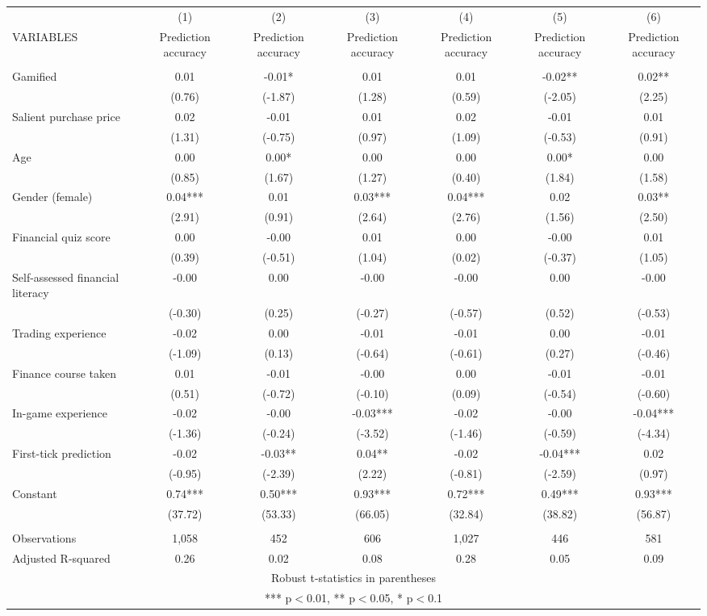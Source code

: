 \documentclass[]{article}
\begin{document}
\begin{tabular}{lcccccc} \hline
 & (1) & (2) & (3) & (4) & (5) & (6) \\
VARIABLES & Prediction accuracy & Prediction accuracy & Prediction accuracy & Prediction accuracy & Prediction accuracy & Prediction accuracy \\ \hline
 &  &  &  &  &  &  \\
Gamified & 0.01 & -0.01* & 0.01 & 0.01 & -0.02** & 0.02** \\
 & (0.76) & (-1.87) & (1.28) & (0.59) & (-2.05) & (2.25) \\
Salient purchase price & 0.02 & -0.01 & 0.01 & 0.02 & -0.01 & 0.01 \\
 & (1.31) & (-0.75) & (0.97) & (1.09) & (-0.53) & (0.91) \\
Age & 0.00 & 0.00* & 0.00 & 0.00 & 0.00* & 0.00 \\
 & (0.85) & (1.67) & (1.27) & (0.40) & (1.84) & (1.58) \\
Gender (female) & 0.04*** & 0.01 & 0.03*** & 0.04*** & 0.02 & 0.03** \\
 & (2.91) & (0.91) & (2.64) & (2.76) & (1.56) & (2.50) \\
Financial quiz score & 0.00 & -0.00 & 0.01 & 0.00 & -0.00 & 0.01 \\
 & (0.39) & (-0.51) & (1.04) & (0.02) & (-0.37) & (1.05) \\
Self-assessed financial literacy & -0.00 & 0.00 & -0.00 & -0.00 & 0.00 & -0.00 \\
 & (-0.30) & (0.25) & (-0.27) & (-0.57) & (0.52) & (-0.53) \\
Trading experience & -0.02 & 0.00 & -0.01 & -0.01 & 0.00 & -0.01 \\
 & (-1.09) & (0.13) & (-0.64) & (-0.61) & (0.27) & (-0.46) \\
Finance course taken & 0.01 & -0.01 & -0.00 & 0.00 & -0.01 & -0.01 \\
 & (0.51) & (-0.72) & (-0.10) & (0.09) & (-0.54) & (-0.60) \\
In-game experience & -0.02 & -0.00 & -0.03*** & -0.02 & -0.00 & -0.04*** \\
 & (-1.36) & (-0.24) & (-3.52) & (-1.46) & (-0.59) & (-4.34) \\
First-tick prediction & -0.02 & -0.03** & 0.04** & -0.02 & -0.04*** & 0.02 \\
 & (-0.95) & (-2.39) & (2.22) & (-0.81) & (-2.59) & (0.97) \\
Constant & 0.74*** & 0.50*** & 0.93*** & 0.72*** & 0.49*** & 0.93*** \\
 & (37.72) & (53.33) & (66.05) & (32.84) & (38.82) & (56.87) \\
 &  &  &  &  &  &  \\
Observations & 1,058 & 452 & 606 & 1,027 & 446 & 581 \\
 Adjusted R-squared & 0.26 & 0.02 & 0.08 & 0.28 & 0.05 & 0.09 \\ \hline
\multicolumn{7}{c}{ Robust t-statistics in parentheses} \\
\multicolumn{7}{c}{ *** p$<$0.01, ** p$<$0.05, * p$<$0.1} \\
\end{tabular}
\end{document}
